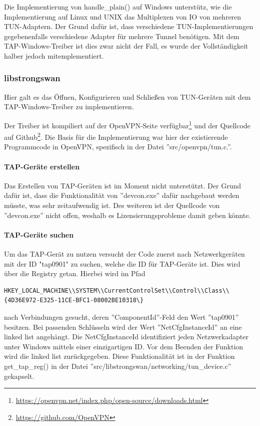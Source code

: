 Die Implementierung von handle\_plain() auf Windows unterstütz, wie die Implementierung
auf Linux und UNIX das Multiplexen von IO von mehreren TUN-Adaptern. Der Grund dafür ist,
dass verschiedene TUN-Implementierungen gegebenenfalls verschiedene Adapter für mehrere Tunnel
benötigen. Mit dem TAP-Windows-Treiber ist dies zwar nicht der Fall, es wurde der Vollständigkeit
halber jedoch mitemplementiert.

\subsubsection{libstrongswan}
Hier galt es das Öffnen, Konfigurieren und Schließen von TUN-Geräten
mit dem TAP-Windows-Treiber zu implementieren.

Der Treiber ist kompiliert auf der OpenVPN-Seite
verfügbar\footnote{\url{https://openvpn.net/index.php/open-source/downloads.html}}
und der Quellcode auf Github\footnote{\url{https://github.com/OpenVPN}}.
Die Basis für die Implementierung war hier der existierende Programmcode in
OpenVPN, spezifisch in  der Datei ''src/openvpn/tun.c.''.

\paragraph{TAP-Geräte erstellen}
Das Erstellen von TAP-Geräten ist im Moment nicht unterstützt. Der Grund dafür ist,
dass die Funktionalität von ''devcon.exe'' dafür nachgebaut werden müsste, was
sehr zeitaufwendig ist. Des weiteren ist der Quellcode von ''devcon.exe'' nicht offen,
weshalb es Lizensierungsprobleme damit geben könnte.

\paragraph{TAP-Geräte suchen}
Um das TAP-Gerät zu nutzen versucht der Code zuerst nach Netzwerkgeräten mit der ID "tap0901" zu suchen,
welche die ID für TAP-Geräte ist. Dies wird über die Registry getan. Hierbei wird
im Pfad \begin{lstlisting}[numbers=none]
HKEY_LOCAL_MACHINE\\SYSTEM\\CurrentControlSet\\Control\\Class\\{4D36E972-E325-11CE-BFC1-08002BE10318\}
\end{lstlisting}
nach Verbindungen gesucht, deren ''ComponentId''-Feld den Wert ''tap0901'' besitzen.
Bei passenden Schlüsseln wird der Wert ''NetCfgInstanceId'' an eine linked list
angehängt. Die NetCfgInstanceId identifiziert jeden Netzwerkadapter unter Windows
mittels einer einzigartigen ID.
Vor dem Beenden der Funktion wird die linked list zurückgegeben.
Diese Funktionalität ist in der Funktion get\_tap\_reg() in der Datei
''src/libstrongswan/networking/tun\_device.c'' gekapselt.


